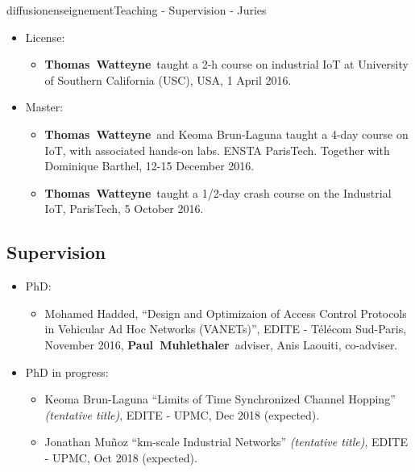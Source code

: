 \documentclass{ra2016}
\newcommand{\paul}             {\textbf{Paul~Muhlethaler}}
\newcommand{\thomas}           {\textbf{Thomas~Watteyne}}
\begin{document}
\begin{module}{diffusion}{enseignement}{Teaching - Supervision - Juries}
\begin{itemize}
    \item License:
        \begin{itemize}
            \item \thomas~taught a 2-h course on industrial IoT at University of Southern California (USC), USA, 1 April 2016.
        \end{itemize}
    \item Master:
        \begin{itemize}
            \item \thomas~and Keoma Brun-Laguna taught a 4-day course on IoT, with associated hands-on labs. ENSTA ParisTech. Together with Dominique Barthel, 12-15 December 2016.
            \item \thomas~taught a 1/2-day crash course on the Industrial IoT, ParisTech, 5 October 2016.
        \end{itemize}
\end{itemize}

\subsection{Supervision}


\begin{itemize}
    \item PhD:
        \begin{itemize}
            \item Mohamed Hadded, ``Design and Optimizaion of Access Control Protocols in Vehicular Ad Hoc Networks (VANETs)'', EDITE - T\'el\'ecom Sud-Paris, November 2016, \paul~adviser, Anis Laouiti, co-adviser.
        \end{itemize}
    \item PhD in progress:
        \begin{itemize}
            \item Keoma Brun-Laguna ``Limits of Time Synchronized Channel Hopping'' \textit{(tentative title)}, EDITE - UPMC, Dec 2018 (expected).
            \item Jonathan Mu\~noz ``km-scale Industrial Networks'' \textit{(tentative title)}, EDITE - UPMC, Oct 2018 (expected).
        \end{itemize}
\end{itemize}


\end{module}
\end{document}
